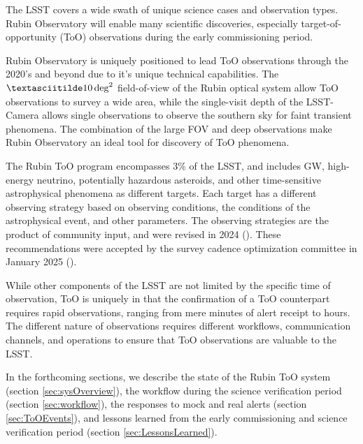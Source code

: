 The LSST covers a wide swath of unique science cases and observation types. Rubin Observatory will enable many scientific discoveries, especially target-of-opportunity (ToO) observations during the early commissioning period. 

Rubin Observatory is uniquely positioned to lead ToO observations through the 2020's and beyond due to it's unique technical capabilities. The $\textasciitilde10\deg^2$ field-of-view of the Rubin optical system allow ToO observations to survey a wide area, while the single-visit depth of the LSST-Camera allows single observations to observe the southern sky for faint transient phenomena. The combination of the large FOV and deep observations make Rubin Observatory an ideal tool for discovery of ToO phenomena.

The Rubin ToO program encompasses 3\% of the LSST, and includes GW, high-energy neutrino, potentially hazardous asteroids, and other time-sensitive astrophysical phenomena as different targets. Each target has a different observing strategy based on observing conditions, the conditions of the astrophysical event, and other parameters. The observing strategies are the product of community input, and were revised in 2024 (\cite{RubinToO2024}). These recommendations were accepted by the survey cadence optimization committee in January 2025 (\cite{PSTN-056}).

While other components of the LSST are not limited by the specific time of observation, ToO is uniquely in that the confirmation of a ToO counterpart requires rapid observations, ranging from mere minutes of alert receipt to hours. The different nature of observations requires different workflows, communication channels, and operations to ensure that ToO observations are valuable to the LSST. 

In the forthcoming sections, we describe the state of the Rubin ToO system (section \ref{sec:sysOverview}), the workflow during the science verification period (section \ref{sec:workflow}), the responses to mock and real alerts (section \ref{sec:ToOEvents}), and lessons learned from the early commissioning and science verification period (section \ref{sec:LessonsLearned}).